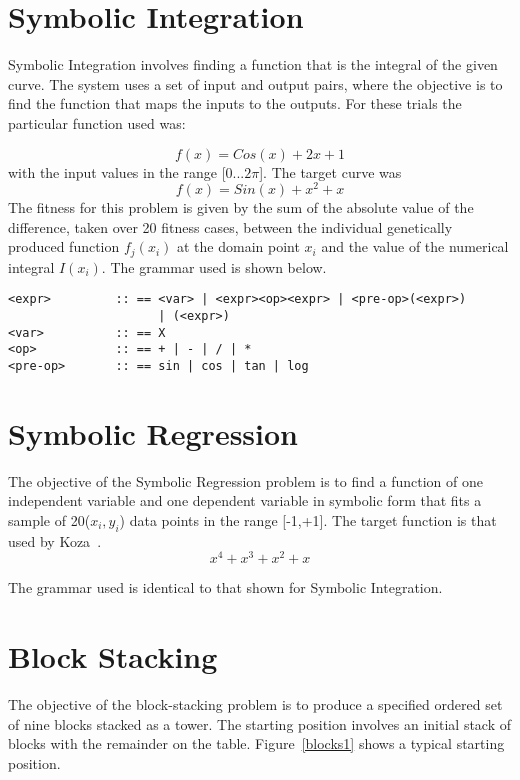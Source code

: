\section{Symbolic Integration}
\label{sym_int_grammar}Symbolic Integration involves finding a function that is the integral of the given curve. The system uses a set of input and output pairs, where the objective is to find the function that maps the inputs to the outputs. For these trials the particular function used was: 

\begin{displaymath}
f(x) = Cos(x) + 2x + 1
\end{displaymath}
with the input values in the range [0...$2\pi$]. The target curve was
\begin{displaymath}
f(x) = Sin(x) + x^2 + x
\end{displaymath}
The fitness for this problem is given by the sum of the absolute value of the difference, taken over 20 fitness cases,  between the individual genetically produced function $f_j(x_i)$ at the domain point $x_i$ and the value of the numerical integral $I(x_i)$. The grammar used is shown below.

\small
\label{sect:symint}\begin{verbatim}
<expr>         :: == <var> | <expr><op><expr> | <pre-op>(<expr>)
                     | (<expr>) 
<var>          :: == X  	                                           
<op>           :: == + | - | / | *                            
<pre-op>       :: == sin | cos | tan | log        

\end{verbatim}
\normalsize

\section{Symbolic Regression}
The objective of the Symbolic Regression problem is to find a function of one independent variable and one dependent variable in symbolic form that fits a sample of 20($x_i,y_i$) data points in the range [-1,+1]. The target function is that used by Koza~\cite{koza}.
\begin{displaymath}
x^4 + x^3 + x^2 + x
\end{displaymath}

The grammar used is identical to that shown for Symbolic Integration.



\section{Block Stacking}
The objective of the block-stacking problem is to produce a specified ordered set of nine blocks stacked as a tower. The starting position involves an initial stack of blocks with the remainder on the table.  Figure~\ref{blocks1} shows a typical starting position.

